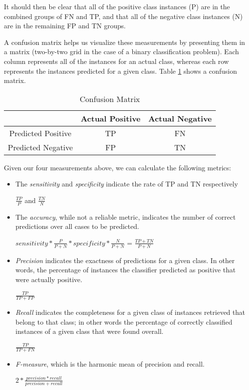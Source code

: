 It should then be clear that all of the positive class instances (P) are in the combined groups of FN and TP, and that all of the negative class instances (N) are in the remaining FP and TN groups.

A confusion matrix helps us visualize these measurements by presenting them in a matrix (two-by-two grid in the case of a binary classification problem). Each column represents all of the instances for an actual class, whereas each row represents the instances predicted for a given class. Table \ref{table:confusion_matrix} shows a confusion matrix.

\begin{table}[]
\centering
\caption{Confusion Matrix\label{table:confusion_matrix}}
\begin{tabular}{|c|c|c|}
\hline
                   & Actual Positive & Actual Negative \\ \hline
Predicted Positive & TP              & FN              \\ \hline
Predicted Negative & FP              & TN              \\ \hline
\end{tabular}
\end{table}

Given our four measurements above, we can calculate the following metrics:
\begin{itemize}
\item The \textit{sensitivity} and \textit{specificity} indicate the rate of TP and TN respectively\begin{center}$\frac{TP}{P}$ and $\frac{TN}{N}$\end{center}
\item The \textit{accuracy}, while not a reliable metric, indicates the number of correct predictions over all cases to be predicted.\begin{center}$sensitivity*\frac{P}{P+N}*specificity*\frac{N}{P+N}$ = $\frac{TP+TN}{P+N}$\end{center}
\item \textit{Precision} indicates the exactness of predictions for a given class. In other words, the percentage of instances the classifier predicted as positive that were actually positive.\begin{center}$\frac{TP}{TP+FP}$\end{center}
\item \textit{Recall} indicates the completeness for a given class of instances retrieved that belong to that class; in other words the percentage of correctly classified instances of a given class that were found overall.\begin{center}$\frac{TP}{TP+FN}$\end{center}
\item \textit{F-measure}, which is the harmonic mean of precision and recall. \begin{center}$2*\frac{precision*recall}{precision+recall}$\end{center}
\end{itemize}

